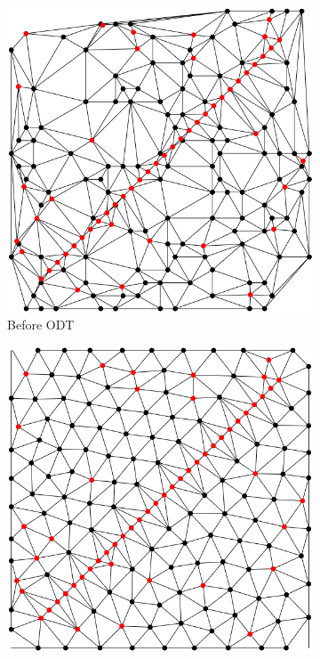 \begin{figure}[ht]
    \centering
    \begin{subfigure}[b]{0.32\textwidth}
        \centering
        \includegraphics[width=\textwidth]{report/Images/Theory/optimal-delaunay/demo_distmesh_before.png}
        \caption{Before ODT}
        \label{fig:ODT-before}
    \end{subfigure}
    \begin{subfigure}[b]{0.32\textwidth}
        \centering
        \includegraphics[width=\textwidth]{report/Images/Theory/optimal-delaunay/demo_distmesh_after.png}

\end{subfigure}
\end{figure}
